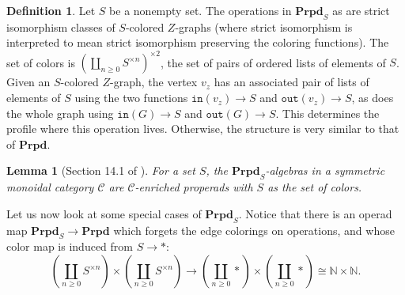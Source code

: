 \documentclass{amsart}
\numberwithin{theorem}{subsection}
\newtheorem{lemma}[theorem]{Lemma}
\theoremstyle{definition}
\newtheorem{definition}[theorem]{Definition}
\newcommand{\xcc}{\mathcal{C}}
\newcommand{\out}{\mathtt{out}}
\newcommand{\inp}{\mathtt{in}}
\newcommand{\bfproperad}{\mathbf{Prpd}}
\begin{document}
\begin{definition}\label{def PrdS}
Let $S$ be a nonempty set.
The operations in $\bfproperad_S$ as are strict isomorphism classes of $S$-colored $Z$-graphs (where strict isomorphism is interpreted to mean strict isomorphism preserving the coloring functions).
The set of colors is $(\coprod_{n\geq 0} S^{\times n})^{\times 2}$, the set of pairs of ordered lists of elements of $S$.
Given an $S$-colored $Z$-graph, the vertex $v_z$ has an associated pair of lists of elements of $S$ using the two functions $\inp(v_z) \to S$ and $\out(v_z) \to S$, as does the whole graph using $\inp(G) \to S$ and $\out(G) \to S$.
This determines the profile where this operation lives.
Otherwise, the structure is very similar to that of $\bfproperad$.
\end{definition}

\begin{lemma}[Section 14.1 of \cite{YauJohnson:FPAM}]\label{YJ Section 14.1}
	For a set $S$, the $\bfproperad_S$-algebras in a symmetric monoidal category $\xcc$ are $\xcc$-enriched properads with $S$ as the set of colors.
\end{lemma}

Let us now look at some special cases of $\bfproperad_S$.
Notice that there is an operad map $\bfproperad_S \to \bfproperad$ which forgets the edge colorings on operations, and whose color map is induced from $S\to *$:
\[
	\left(\coprod_{n\geq 0} S^{\times n}\right) \times \left(\coprod_{n\geq 0} S^{\times n}\right) \to \left(\coprod_{n\geq 0} *\right) \times \left(\coprod_{n\geq 0} *\right) \cong \mathbb{N} \times \mathbb{N}.
\]
\end{document}
